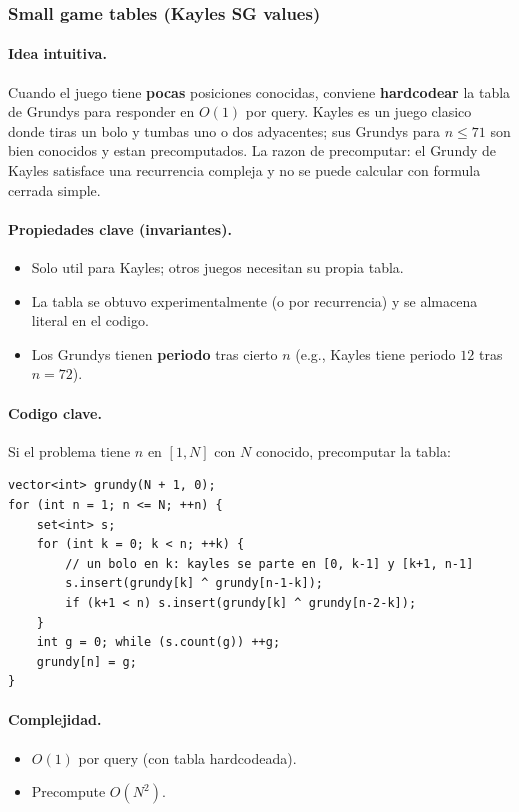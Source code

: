 ﻿\subsubsection{Small game tables (Kayles SG values)}

\paragraph{Idea intuitiva.}
Cuando el juego tiene \textbf{pocas} posiciones conocidas, conviene \textbf{hardcodear} la tabla de Grundys para responder en $O(1)$ por query. Kayles es un juego clasico donde tiras un bolo y tumbas uno o dos adyacentes; sus Grundys para $n \le 71$ son bien conocidos y estan precomputados. La razon de precomputar: el Grundy de Kayles satisface una recurrencia compleja y no se puede calcular con formula cerrada simple.

\paragraph{Propiedades clave (invariantes).}
\begin{itemize}\setlength\itemsep{0pt}
	\item Solo util para Kayles; otros juegos necesitan su propia tabla.
	\item La tabla se obtuvo experimentalmente (o por recurrencia) y se almacena literal en el codigo.
	\item Los Grundys tienen \textbf{periodo} tras cierto $n$ (e.g., Kayles tiene periodo $12$ tras $n = 72$).
\end{itemize}

\paragraph{Codigo clave.}
Si el problema tiene $n$ en $[1, N]$ con $N$ conocido, precomputar la tabla:
\begin{verbatim}
vector<int> grundy(N + 1, 0);
for (int n = 1; n <= N; ++n) {
    set<int> s;
    for (int k = 0; k < n; ++k) {
        // un bolo en k: kayles se parte en [0, k-1] y [k+1, n-1]
        s.insert(grundy[k] ^ grundy[n-1-k]);
        if (k+1 < n) s.insert(grundy[k] ^ grundy[n-2-k]);
    }
    int g = 0; while (s.count(g)) ++g;
    grundy[n] = g;
}
\end{verbatim}

\paragraph{Complejidad.}
\begin{itemize}\setlength\itemsep{0pt}
	\item $O(1)$ por query (con tabla hardcodeada).
	\item Precompute $O(N^2)$.
\end{itemize}

